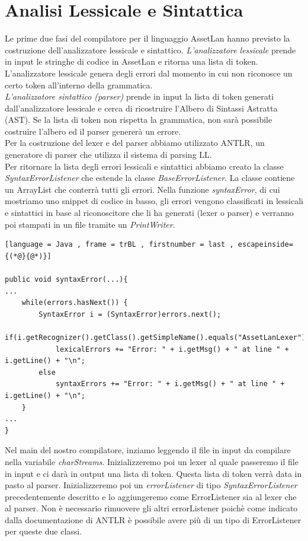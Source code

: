 \documentclass[12pt, a4paper]{report}
\begin{document}
    \chapter{Analisi Lessicale e Sintattica}
    Le prime due fasi del compilatore per il linguaggio AssetLan hanno previsto la costruzione dell'analizzatore lessicale e sintattico. 
    \emph{L'analizzatore lessicale} prende in input le stringhe di codice in AssetLan e ritorna una lista di token. L'analizzatore lessicale genera degli errori dal momento in cui non riconosce un certo token all'interno della grammatica. \\
    \emph{L'analizzatore sintattico (parser)} prende in input la lista di token generati dall'analizzatore lessicale e cerca di ricostruire l'Albero di Sintassi Astratta (AST). Se la lista di token non rispetta la grammatica, non sarà possibile costruire l'albero ed il parser genererà un errore. \\
    Per la costruzione del lexer e del parser abbiamo utilizzato ANTLR, un generatore di parser che utilizza il sistema di parsing LL.\\
    Per ritornare la lista degli errori lessicali e sintattici abbiamo creato la classe \emph{SyntaxErrorListener} che estende la classe \emph{BaseErrorListener}. La classe contiene un ArrayList che conterrà tutti gli errori. Nella funzione \emph{syntaxError}, di cui mostriamo uno snippet di codice in basso, gli errori vengono classificati in lessicali e sintattici in base al riconoscitore che li ha generati (lexer o parser) e verranno poi stampati in un file tramite un \emph{PrintWriter}. 
    \begin{lstlisting}[language = Java , frame = trBL , firstnumber = last , escapeinside={(*@}{@*)}]

public void syntaxError(...){
...
    while(errors.hasNext()) {
        SyntaxError i = (SyntaxError)errors.next();
        if(i.getRecognizer().getClass().getSimpleName().equals("AssetLanLexer"))
            lexicalErrors += "Error: " + i.getMsg() + " at line " + i.getLine() + "\n";
        else
            syntaxErrors += "Error: " + i.getMsg() + " at line " + i.getLine() + "\n";
    }
...
}
    \end{lstlisting} 
    Nel main del nostro compilatore, inziamo leggendo il file in input da compilare nella variabile \emph{charStreams}. Inizializzeremo poi un lexer al quale passeremo il file in input e ci darà in output una lista di token. Questa lista di token verrà data in pasto al parser. Inizializzeremo poi un \emph{errorListener} di tipo \emph{SyntaxErrorListener} precedentemente descritto e lo aggiungeremo come ErrorListener sia al lexer che al parser. Non è necessario rimuovere gli altri errorListener poichè come indicato dalla documentazione di ANTLR è possibile  avere più di un tipo di ErrorListener per queste due classi. 
\end{document}
